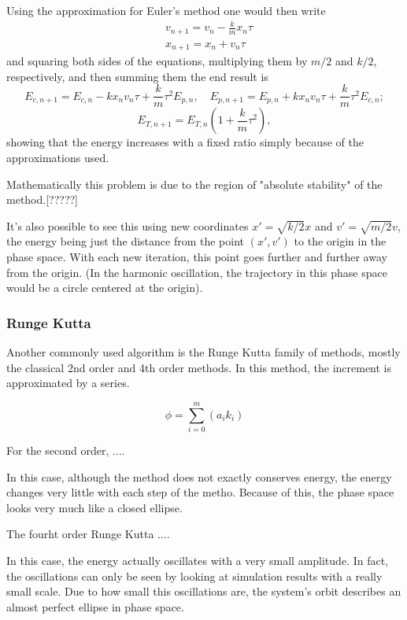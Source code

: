 Using the approximation for Euler's method one would then write
\begin{equation*}
\begin{aligned}
&v_{n+1} = v_n -\frac{k}{m}x_n \tau\\
&x_{n+1} = x_n + v_n \tau
\end{aligned}
\end{equation*}
and squaring both sides of the equations, multiplying them by $m/2$ and $k/2$, respectively, and then summing them the end result is
$$
E_{c,n+1} = E_{c,n} -k x_n v_n \tau + \frac{k}{m} \tau^2 E_{p,n}, \quad
E_{p,n+1} = E_{p,n} + k x_n v_n \tau + \frac{k}{m} \tau^2 E_{c,n};
$$
\begin{equation*}
E_{T, n+1} = E_{T,n}\left(1 + \frac{k}{m}\tau^2\right),
\end{equation*}
showing that the energy increases with a fixed ratio simply because of the approximations used.

Mathematically this problem is due to the region of "absolute stability" of the method.[?????]

It's also possible to see this using new coordinates $x' = \sqrt{k/2}x$ and $v' = \sqrt{m/2}v$, the energy being just the distance from the point $(x',v')$ to the origin in the phase space. With each new iteration, this point goes further and further away from the origin.
(In the harmonic oscillation, the trajectory in this phase space would be a circle centered at the origin).


\subsubsection{Runge Kutta}

Another commonly used algorithm is the Runge Kutta family of methods, mostly the classical 2nd order and 4th order methods. In this method, the increment is approximated by a series.

$$\phi = \sum_{i=0}^{m}(a_i k_i)$$

For the second order, ....

In this case, although the method does not exactly conserves energy, the energy changes very little with each step of the metho. Because of this, the phase space looks very much like a closed ellipse.

The fourht order Runge Kutta ....

In this case, the energy actually oscillates with a very small amplitude. In fact, the oscillations can only be seen by looking at simulation results with a really small scale. Due to how small this oscillations are, the system's orbit describes an almost perfect ellipse in phase space.

